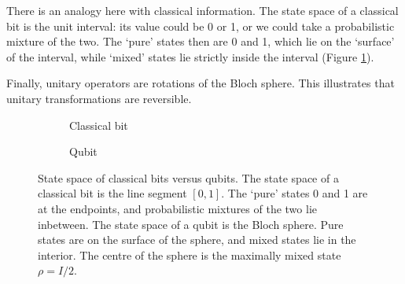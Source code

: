 \documentclass{article}
\makeatletter
\renewcommand\bra[1]{{\langle{#1}|}}
\renewcommand\ket[1]{
  \@ifnextchar\bra{\k@t{#1}\!}{\k@t{#1}}
}
\renewcommand\ket[1]{
  \@ifnextchar\braket{\k@t{#1}\!}{\k@t{#1}}
}
\newcommand\k@t[1]{{|{#1}\rangle}}
\theoremstyle{definition}
\makeatother
\begin{document}
There is an analogy here with classical information. The state space of a classical bit is the unit interval: its value could be 0 or 1, or we could take a probabilistic mixture of the two. The `pure' states then are 0 and 1, which lie on the `surface' of the interval, while `mixed' states lie strictly inside the interval (Figure \ref{fig:cbit_state_space}). 

Finally, unitary operators are rotations of the Bloch sphere. This illustrates that unitary transformations are reversible.

\begin{figure}
\centering
\begin{subfigure}{0.25\linewidth}
\centering
{}
\caption{Classical bit}
\label{fig:cbit_state_space}
\end{subfigure}%
\begin{subfigure}{0.75\linewidth}
\centering
{}
\caption{Qubit}
\label{fig:qubit_state_space}
\end{subfigure}

\caption{State space of classical bits versus qubits. The state space of a classical bit is the line segment $[0,1]$. The `pure' states 0 and 1 are at the endpoints, and probabilistic mixtures of the two lie inbetween. The state space of a qubit is the Bloch sphere. Pure states are on the surface of the sphere, and mixed states lie in the interior. The centre of the sphere is the maximally mixed state $\rho=I/2$.}
\end{figure}
\end{document}
